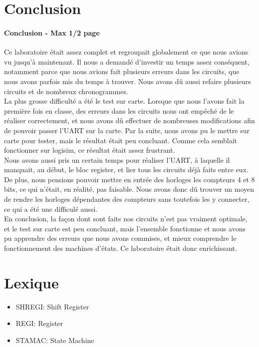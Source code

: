 \documentclass[a4paper]{article} %
\begin{document}
\section {Conclusion}
\begin{tcolorbox}[colframe=Monokaimagenta,colback=white]

\paragraph{Conclusion - Max 1/2 page}
Ce laboratoire était assez complet et regroupait globalement ce que nous avions vu jusqu'à maintenant. Il nous a demandé d'investir un temps assez conséquent, notamment parce que nous avions fait plusieurs erreurs dans les circuits, que nous avons parfois mis du temps à trouver. Nous avons dû aussi refaire plusieurs circuits et de nombreux chronogrammes.\\

La plus grosse difficulté a été le test sur carte. Lorsque que nous l'avons fait la première fois en classe, des erreurs dans les circuits nous ont empêché de le réaliser correctement, et nous avons dû effectuer de nombreuses modifications afin de pouvoir passer l'UART sur la carte. Par la suite, nous avons pu le mettre sur carte pour tester, mais le résultat était peu concluant. Comme cela semblait fonctionner sur logisim, ce résultat était assez frustrant.\\
Nous avons aussi pris un certain temps pour réaliser l'UART, à laquelle il manquait, au début, le bloc register, et lier tous les circuits déjà faits entre eux. De plus, nous pensions pouvoir mettre en entrée des horloges les compteurs 4 et 8 bits, ce qui n'était, en réalité, pas faisable. Nous avons donc dû trouver un moyen de rendre les horloges dépendantes des compteurs sans toutefois les y connecter, ce qui a été une difficulé aussi.\\
En conclusion, la façon dont sont faits nos circuits n'est pas vraiment optimale, et le test sur carte est peu concluant, mais l'ensemble fonctionne et nous avons pu apprendre des erreurs que nous avons commises, et mieux comprendre le fonctionnement des machines d'états. Ce laboratoire était donc enrichissant.

\end{tcolorbox}

\section{Lexique}
\begin{itemize}
    \item     SHREGI: Shift Register
    \item     REGI: Register
    \item     STAMAC: State Machine
\end{itemize}
\end{document}
